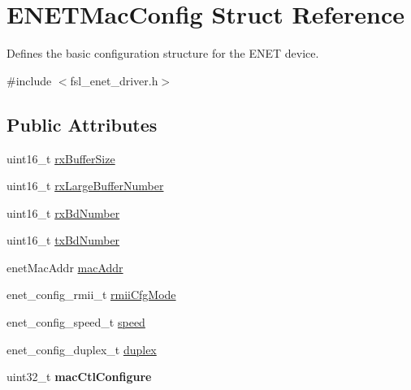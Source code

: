 \hypertarget{structENETMacConfig}{}\section{E\+N\+E\+T\+Mac\+Config Struct Reference}
\label{structENETMacConfig}


Defines the basic configuration structure for the E\+N\+ET device.  




{\ttfamily \#include $<$fsl\+\_\+enet\+\_\+driver.\+h$>$}

\subsection*{Public Attributes}
\begin{DoxyCompactItemize}
\item 
uint16\+\_\+t \hyperlink{structENETMacConfig_a16dcf40e2aedc73164a3340d4c53fd12}{rx\+Buffer\+Size}
\item 
uint16\+\_\+t \hyperlink{structENETMacConfig_a678df9b8b404e7aaf15d6297e7bc548c}{rx\+Large\+Buffer\+Number}
\item 
uint16\+\_\+t \hyperlink{structENETMacConfig_a5241b693ec7b7ad33815586abf75484b}{rx\+Bd\+Number}
\item 
uint16\+\_\+t \hyperlink{structENETMacConfig_a080cd5e2605b273bd4f1a9ac3b0d0e02}{tx\+Bd\+Number}
\item 
enet\+Mac\+Addr \hyperlink{structENETMacConfig_a6aa1246b584e02fefc091b7b4066976e}{mac\+Addr}
\item 
enet\+\_\+config\+\_\+rmii\+\_\+t \hyperlink{structENETMacConfig_a74f82947427397ac885520f4a3078e7a}{rmii\+Cfg\+Mode}
\item 
enet\+\_\+config\+\_\+speed\+\_\+t \hyperlink{structENETMacConfig_a5d76349c96516955ed7e57440bf72a8d}{speed}
\item 
enet\+\_\+config\+\_\+duplex\+\_\+t \hyperlink{structENETMacConfig_aaaa9c5ef969c036951ea363057a0b99c}{duplex}
\item 
uint32\+\_\+t {\bfseries mac\+Ctl\+Configure}\hypertarget{structENETMacConfig_adc3767b7e12cf83ee45746fc05031702}{}\label{structENETMacConfig_adc3767b7e12cf83ee45746fc05031702}


\end{DoxyCompactItemize}
